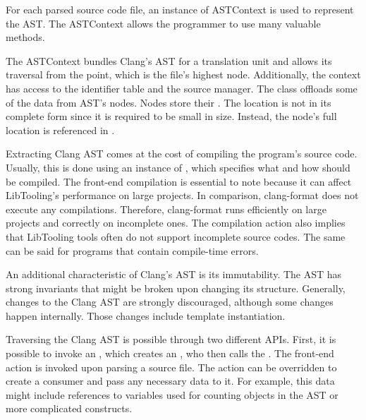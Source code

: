 For each parsed source code file, an instance of ASTContext 
is used to represent the AST. 
The ASTContext allows the programmer to use many valuable methods. 


The ASTContext bundles Clang's AST for a translation unit 
and allows its traversal from the 
point, which is the file's highest node. 
Additionally, the context has access to the identifier table 
and the source manager. 
The  class offloads some of the data 
from AST's nodes. 
Nodes store their . 
The location is not in its complete form since it is required 
to be small in size. 
Instead, the node's full location is referenced 
in .

Extracting Clang AST comes at the cost of compiling the program's
source code. 
Usually, this is done using an instance of , 
which specifies what and how should be compiled. 
The front-end compilation is essential to note because it can affect 
LibTooling's performance on large projects. 
In comparison, clang-format does not execute any compilations. 
Therefore, clang-format runs efficiently on large projects 
and correctly on incomplete ones. 
The compilation action also implies that LibTooling tools often 
do not support incomplete source codes. 
The same can be said for programs that contain compile-time errors.

An additional characteristic of Clang's AST is its immutability. 
The AST has strong invariants that might be broken upon changing 
its structure. 
Generally, changes to the Clang AST are strongly discouraged, 
although some changes happen internally. 
Those changes include template instantiation.

Traversing the Clang AST is possible through two different APIs. 
First, it is possible to invoke an , which 
creates an , who then calls 
the . 
The front-end action is invoked upon parsing a source file. 
The action can be overridden to create a consumer and pass any necessary 
data to it. 
For example, this data might include references to variables used for 
counting objects in the AST or more complicated constructs. 

